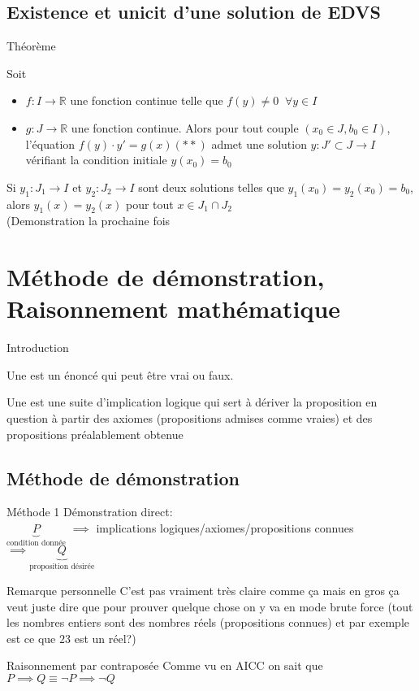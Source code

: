 \section{Existence et unicit d'une solution de EDVS}
\begin{parag}{Théorème}
    \begin{theoreme}
        Soit \begin{itemize}
            \item $f: I \to \mathbb{R}$ une fonction continue telle que $f(y) \neq 0\;\; \forall y \in I$
            \item $g : J \to \mathbb{R}$ une fonction continue. Alors pour tout couple $(x_0 \in J, b_0 \in I)$, l'équation $f(y)\cdot y' = g(x) (**)$ admet une solution $y : J' \subset J \to I$ vérifiant la condition initiale $y(x_0) = b_0$
        \end{itemize}
        Si $y_1 : J_1 \to I$ et $y_2 : J_2 \to I$ sont deux solutions telles que $y_1(x_0) = y_2(x_0) = b_0$, alors $y_1(x) = y_2(x)$ pour tout $x \in J_1 \cap J_2$
        \\
        (Demonstration la prochaine fois
        
    \end{theoreme}
\end{parag}
\chapter{Méthode de démonstration, Raisonnement mathématique}
\begin{parag}{Introduction}
    \begin{definition}
        Une  est un énoncé qui peut être vrai ou faux.
    \end{definition}
    \begin{definition}
        Une  est une suite d'implication logique qui sert à dériver la proposition en question à partir des axiomes (propositions admises comme vraies) et des propositions préalablement obtenue
    \end{definition}
\end{parag}
\section{Méthode de démonstration}
\begin{parag}{Méthode 1}
    Démonstration direct:\\ $\underbrace{P}_{\text{condition donnée}}$ $\implies$ implications logiques/axiomes/propositions connues $\implies \underbrace{Q}_{\text{proposition désirée}}$
    \begin{subparag}{Remarque personnelle}
        C'est pas vraiment très claire comme ça mais en gros ça veut juste dire que pour prouver quelque chose on y va en mode brute force (tout les nombres entiers sont des nombres réels (propositions connues) et par exemple est ce que $23$ est un réel?) 
    \end{subparag}
\end{parag}
\begin{parag}{Raisonnement par contraposée}
    Comme vu en AICC on sait que $P \implies Q \equiv \neg P \implies \neg Q$
\end{parag}
